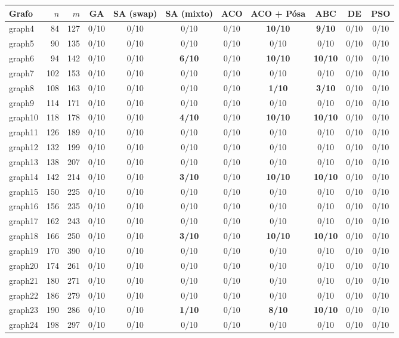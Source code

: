 \begin{tabular}{lrrcccccccc}
\toprule
Grafo & $n$ & $m$ & GA & SA (swap) & SA (mixto) & ACO & ACO + Pósa & ABC & DE & PSO \\
\midrule
graph4 & 84 & 127 & 0/10 & 0/10 & 0/10 & 0/10 & \textbf{10/10} & \textbf{9/10} & 0/10 & 0/10 \\
graph5 & 90 & 135 & 0/10 & 0/10 & 0/10 & 0/10 & 0/10 & 0/10 & 0/10 & 0/10 \\
graph6 & 94 & 142 & 0/10 & 0/10 & \textbf{6/10} & 0/10 & \textbf{10/10} & \textbf{10/10} & 0/10 & 0/10 \\
graph7 & 102 & 153 & 0/10 & 0/10 & 0/10 & 0/10 & 0/10 & 0/10 & 0/10 & 0/10 \\
graph8 & 108 & 163 & 0/10 & 0/10 & 0/10 & 0/10 & \textbf{1/10} & \textbf{3/10} & 0/10 & 0/10 \\
graph9 & 114 & 171 & 0/10 & 0/10 & 0/10 & 0/10 & 0/10 & 0/10 & 0/10 & 0/10 \\
graph10 & 118 & 178 & 0/10 & 0/10 & \textbf{4/10} & 0/10 & \textbf{10/10} & \textbf{10/10} & 0/10 & 0/10 \\
graph11 & 126 & 189 & 0/10 & 0/10 & 0/10 & 0/10 & 0/10 & 0/10 & 0/10 & 0/10 \\
graph12 & 132 & 199 & 0/10 & 0/10 & 0/10 & 0/10 & 0/10 & 0/10 & 0/10 & 0/10 \\
graph13 & 138 & 207 & 0/10 & 0/10 & 0/10 & 0/10 & 0/10 & 0/10 & 0/10 & 0/10 \\
graph14 & 142 & 214 & 0/10 & 0/10 & \textbf{3/10} & 0/10 & \textbf{10/10} & \textbf{10/10} & 0/10 & 0/10 \\
graph15 & 150 & 225 & 0/10 & 0/10 & 0/10 & 0/10 & 0/10 & 0/10 & 0/10 & 0/10 \\
graph16 & 156 & 235 & 0/10 & 0/10 & 0/10 & 0/10 & 0/10 & 0/10 & 0/10 & 0/10 \\
graph17 & 162 & 243 & 0/10 & 0/10 & 0/10 & 0/10 & 0/10 & 0/10 & 0/10 & 0/10 \\
graph18 & 166 & 250 & 0/10 & 0/10 & \textbf{3/10} & 0/10 & \textbf{10/10} & \textbf{10/10} & 0/10 & 0/10 \\
graph19 & 170 & 390 & 0/10 & 0/10 & 0/10 & 0/10 & 0/10 & 0/10 & 0/10 & 0/10 \\
graph20 & 174 & 261 & 0/10 & 0/10 & 0/10 & 0/10 & 0/10 & 0/10 & 0/10 & 0/10 \\
graph21 & 180 & 271 & 0/10 & 0/10 & 0/10 & 0/10 & 0/10 & 0/10 & 0/10 & 0/10 \\
graph22 & 186 & 279 & 0/10 & 0/10 & 0/10 & 0/10 & 0/10 & 0/10 & 0/10 & 0/10 \\
graph23 & 190 & 286 & 0/10 & 0/10 & \textbf{1/10} & 0/10 & \textbf{8/10} & \textbf{10/10} & 0/10 & 0/10 \\
graph24 & 198 & 297 & 0/10 & 0/10 & 0/10 & 0/10 & 0/10 & 0/10 & 0/10 & 0/10 \\
\bottomrule
\end{tabular}
